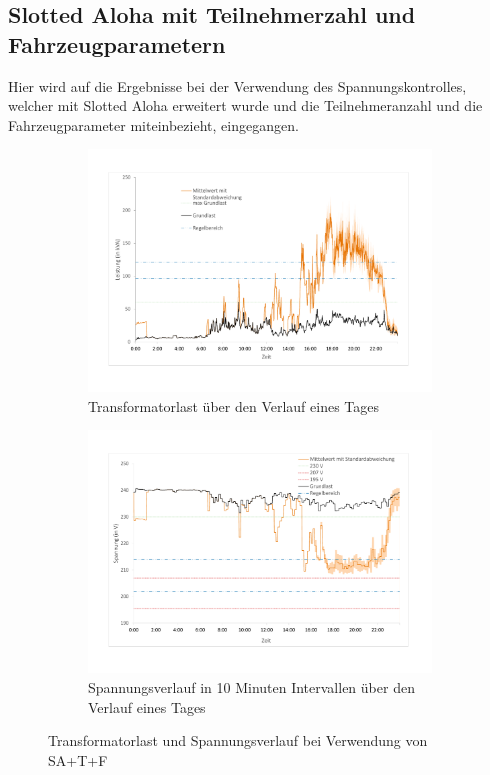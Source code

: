 \subsection{Slotted Aloha mit Teilnehmerzahl und Fahrzeugparametern}
\label{chap_SAwt}
Hier wird auf die Ergebnisse bei der Verwendung des Spannungskontrolles, welcher mit Slotted Aloha erweitert wurde und die Teilnehmeranzahl und die Fahrzeugparameter miteinbezieht, eingegangen. 
\begin{figure}
	\begin{subfigure}{\linewidth}
		\includegraphics[scale=0.45]{img/SA_wT/TrafoLast5.pdf}
		\caption{Transformatorlast über den Verlauf eines Tages}
		\label{Abb_SAwtTrafoLast}
	\end{subfigure}
	\begin{subfigure}{\linewidth}
		\includegraphics[scale=0.45]{img/SA_wT/Voltage2.pdf}
		\caption{Spannungsverlauf in 10 Minuten Intervallen über den Verlauf eines Tages}
		\label{Abb_SAwtSpannung}
	\end{subfigure}
	\caption{Transformatorlast und Spannungsverlauf bei Verwendung von SA+T+F}
\end{figure}

